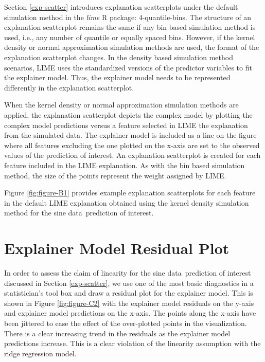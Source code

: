 \documentclass[AMS,STIX2COL]{WileyNJD-v2}\usepackage[]{graphicx}\usepackage[]{color}
\newcommand{\data}{sine data}
\renewcommand{\sout}[1]{\unskip}
\begin{document}
Section \ref{exp-scatter} introduces explanation scatterplots under the default simulation method in the \emph{lime} R package: 4-quantile-bins. The structure of an explanation scatterplot remains the same if any bin based simulation method is used, i.e., any number of quantile or equally spaced bins. However, if the kernel density or normal approximation simulation methods are used, the format of the explanation scatterplot changes. In the density based simulation method scenarios, LIME uses the standardized versions of the predictor variables to fit the explainer model. Thus, the explainer model needs to be represented differently in the explanation scatterplot.

When the kernel density or normal approximation simulation methods are applied, the explanation scatterplot depicts the complex model by plotting the complex model predictions versus a feature selected in LIME the explanation from the simulated data. The explainer model is included as a line on the figure where all features excluding the one plotted on the x-axis are set to the observed values of the prediction of interest. An explanation scatterplot is created for each feature included in the LIME explanation. As with the bin based simulation method, the size of the points represent the weight assigned by LIME.

Figure \ref{fig:figure-B1} provides example explanation scatterplots for each feature in the default LIME explanation obtained using the kernel density simulation method for the \data \ prediction of interest. \sout{Figure \ref{fig:figure-F5} includes explanation scatterplots for the explanations generated using kernel density simulation for the bullet example cases M and NM discussed in Section \ref{bullet-assess-ex}.}

\section{Explainer Model Residual Plot} \label{residual-plot}

In order to assess the claim of linearity for the \data \ prediction of interest discussed in Section \ref{exp-scatter}, we use one of the most basic diagnostics in a statistician's tool box and draw a residual plot for the explainer model. This is shown in Figure \ref{fig:figure-C2} with the explainer model residuals on the y-axis and explainer model predictions on the x-axis. The points along the x-axis have been jittered to ease the effect of the over-plotted points in the visualization. There is a clear increasing trend in the residuals as the explainer model predictions increase. This is a clear violation of the linearity assumption with the ridge regression model.
\end{document}
